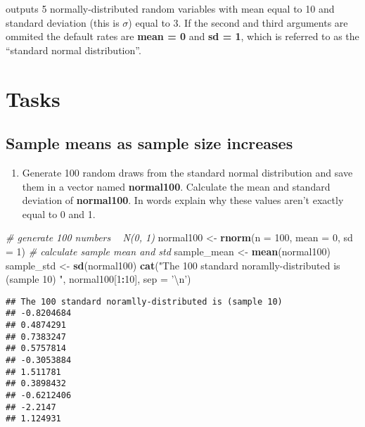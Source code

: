 \documentclass[]{article}
\newenvironment{Shaded}{\begin{snugshade}}{\end{snugshade}}
\newcommand{\KeywordTok}[1]{\textcolor[rgb]{0.13,0.29,0.53}{\textbf{#1}}}
\newcommand{\DataTypeTok}[1]{\textcolor[rgb]{0.13,0.29,0.53}{#1}}
\newcommand{\DecValTok}[1]{\textcolor[rgb]{0.00,0.00,0.81}{#1}}
\newcommand{\CharTok}[1]{\textcolor[rgb]{0.31,0.60,0.02}{#1}}
\newcommand{\StringTok}[1]{\textcolor[rgb]{0.31,0.60,0.02}{#1}}
\newcommand{\CommentTok}[1]{\textcolor[rgb]{0.56,0.35,0.01}{\textit{#1}}}
\newcommand{\OperatorTok}[1]{\textcolor[rgb]{0.81,0.36,0.00}{\textbf{#1}}}
\newcommand{\NormalTok}[1]{#1}
\providecommand{\tightlist}{%
  \setlength{\itemsep}{0pt}\setlength{\parskip}{0pt}}
\begin{document}
outputs 5 normally-distributed random variables with mean equal to 10
and standard deviation (this is \(\sigma\)) equal to 3. If the second
and third arguments are ommited the default rates are \textbf{mean = 0}
and \textbf{sd = 1}, which is referred to as the ``standard normal
distribution''.

\section{Tasks}\label{tasks}

\subsection{Sample means as sample size
increases}\label{sample-means-as-sample-size-increases}

\begin{enumerate}
\def\labelenumi{\arabic{enumi})}
\tightlist
\item
  Generate 100 random draws from the standard normal distribution and
  save them in a vector named \textbf{normal100}. Calculate the mean and
  standard deviation of \textbf{normal100}. In words explain why these
  values aren't exactly equal to 0 and 1.
\end{enumerate}

\begin{Shaded}
\begin{Highlighting}[]
\CommentTok{# generate 100 numbers ~ N(0, 1)}
\NormalTok{normal100 <-}\StringTok{ }\KeywordTok{rnorm}\NormalTok{(}\DataTypeTok{n =} \DecValTok{100}\NormalTok{, }\DataTypeTok{mean =} \DecValTok{0}\NormalTok{, }\DataTypeTok{sd =} \DecValTok{1}\NormalTok{)}
\CommentTok{# calculate sample mean and std}
\NormalTok{sample_mean <-}\StringTok{ }\KeywordTok{mean}\NormalTok{(normal100)}
\NormalTok{sample_std <-}\StringTok{ }\KeywordTok{sd}\NormalTok{(normal100)}
\KeywordTok{cat}\NormalTok{(}\StringTok{"The 100 standard noramlly-distributed is (sample 10) "}\NormalTok{, normal100[}\DecValTok{1}\OperatorTok{:}\DecValTok{10}\NormalTok{], }\DataTypeTok{sep =} \StringTok{'}\CharTok{\textbackslash{}n}\StringTok{'}\NormalTok{)}
\end{Highlighting}
\end{Shaded}

\begin{verbatim}
## The 100 standard noramlly-distributed is (sample 10) 
## -0.8204684
## 0.4874291
## 0.7383247
## 0.5757814
## -0.3053884
## 1.511781
## 0.3898432
## -0.6212406
## -2.2147
## 1.124931
\end{verbatim}
\end{document}
